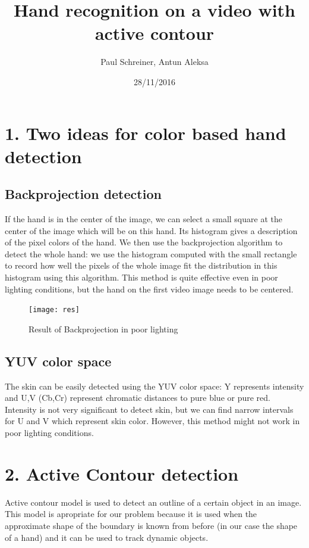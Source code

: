 \documentclass{report}
\title{Hand recognition on a video with active contour}
\author{Paul Schreiner, Antun Aleksa}
\date{28/11/2016}
\begin{document}
\maketitle



\section*{1. Two ideas for color based hand detection}

\subsection*{Backprojection detection}

If the hand is in the center of the image, we can select a small square at the center of the image which will be on this hand. Its histogram gives a description of the pixel colors of the hand. We then use the backprojection algorithm to detect the whole hand: we use the histogram computed with the small rectangle to record how well the pixels of the whole image fit the distribution in this histogram using this algorithm. This method is quite effective even in poor lighting conditions, but the hand on the first video image needs to be centered. 

\begin{figure}[H]
\centering
              \texttt{[image: res]}
              \caption{Result of Backprojection in poor lighting}
          \end{figure}

\subsection*{YUV color space}

The skin can be easily detected using the YUV color space: Y represents intensity and U,V (Cb,Cr) represent chromatic distances to pure blue or pure red. Intensity is not very significant to detect skin, but we can find narrow intervals for U and V which represent skin color. However, this method might not work in poor lighting conditions. 



\section*{2. Active Contour detection}

Active contour model is used to detect an outline of a certain object in an image. This model is apropriate for our problem because it is used when the approximate shape of the boundary is known from before (in our case the shape of a hand) and it can be used to track dynamic objects. 
\end{document}

